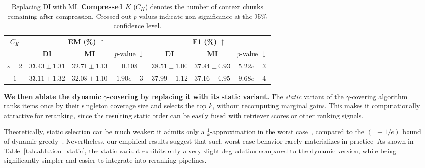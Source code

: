 \documentclass{article} %
\theoremstyle{definition}
\begin{document}
\begin{table}[h]
\centering
\caption{\small Replacing DI with MI. 
\textbf{Compressed $K$} ($C_K$) denotes the number of context chunks remaining after compression. Crossed-out $p$-values indicate non-significance at the 95\% confidence level.} 
\label{tab:ablation_mi}
\begin{tabular}{c|ccc|ccc}
\toprule
\multirow{2}{*}{\small \textbf{$C_K$}} & \multicolumn{3}{c|}{\small \textbf{EM (\%) $\uparrow$}} & \multicolumn{3}{c}{\small \textbf{F1 (\%) $\uparrow$}} \\
 & \small \textbf{DI} & \small \textbf{MI} & \small $p$-value $\downarrow$ & \small \textbf{DI} & \small \textbf{MI} & \small $p$-value $\downarrow$ \\
\midrule
\small $s-2$ & \small $33.43\pm 1.31 $ & \small $32.71\pm 1.13$ & \small $0.108 $ & \small $38.51\pm 1.00 $ & \small $37.84\pm 0.93$ & \small $5.22e-3 $ \\
\midrule
\small $1$ & \small $33.11\pm 1.32 $ & \small $32.08\pm 1.10$ & \small $1.90e-3 $ & \small $37.99\pm 1.12 $ & \small $37.16\pm 0.95 $ & \small $9.68e-4 $ \\
\bottomrule
\end{tabular}
\end{table}

\textbf{We then ablate the dynamic $\gamma$-covering by replacing it with its static variant.} The \emph{static} variant of the $\gamma$-covering algorithm ranks items once by their singleton coverage size and selects the top $k$, without recomputing marginal gains. This makes it computationally attractive for reranking, since the resulting static order can be easily fused with retriever scores or other ranking signals.  

Theoretically, static selection can be much weaker: it admits only a $\tfrac{1}{k}$-approximation in the worst case~\citep{khuller1999budgeted}, compared to the $(1-1/e)$ bound of dynamic greedy~\citep{nemhauser1978analysis}. Nevertheless, our empirical results suggest that such worst-case behavior rarely materializes in practice. As shown in Table~\ref{tab:ablation_static}, the static variant exhibits only a very slight degradation compared to the dynamic version, while being significantly simpler and easier to integrate into reranking pipelines.
\end{document}
